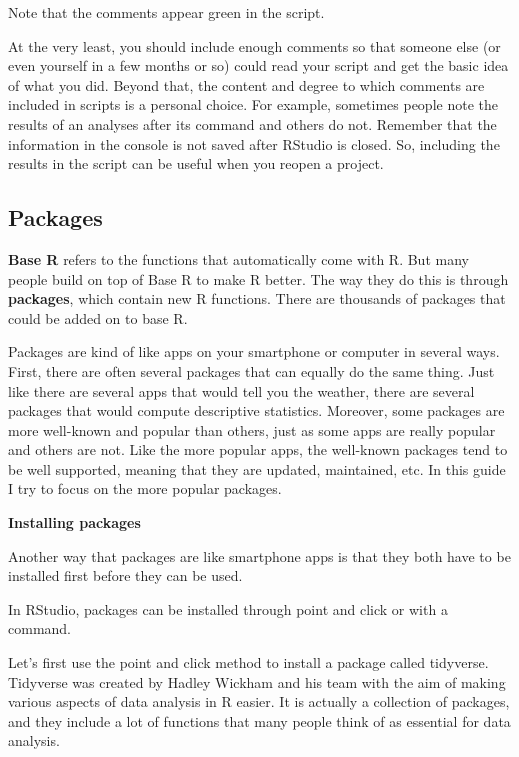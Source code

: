 \documentclass[
]{book}
\begin{document}
Note that the comments appear green in the script.

At the very least, you should include enough comments so that someone else (or even yourself in a few months or so) could read your script and get the basic idea of what you did. Beyond that, the content and degree to which comments are included in scripts is a personal choice. For example, sometimes people note the results of an analyses after its command and others do not. Remember that the information in the console is not saved after RStudio is closed. So, including the results in the script can be useful when you reopen a project.

\hypertarget{packages}{%
\subsection{Packages}\label{packages}}

\textbf{Base R} refers to the functions that automatically come with R. But many people build on top of Base R to make R better. The way they do this is through \textbf{packages}, which contain new R functions. There are thousands of packages that could be added on to base R.

Packages are kind of like apps on your smartphone or computer in several ways. First, there are often several packages that can equally do the same thing. Just like there are several apps that would tell you the weather, there are several packages that would compute descriptive statistics. Moreover, some packages are more well-known and popular than others, just as some apps are really popular and others are not. Like the more popular apps, the well-known packages tend to be well supported, meaning that they are updated, maintained, etc. In this guide I try to focus on the more popular packages.

\textbf{Installing packages}

Another way that packages are like smartphone apps is that they both have to be installed first before they can be used.

In RStudio, packages can be installed through point and click or with a command.

Let's first use the point and click method to install a package called tidyverse. Tidyverse was created by Hadley Wickham and his team with the aim of making various aspects of data analysis in R easier. It is actually a collection of packages, and they include a lot of functions that many people think of as essential for data analysis.
\end{document}
